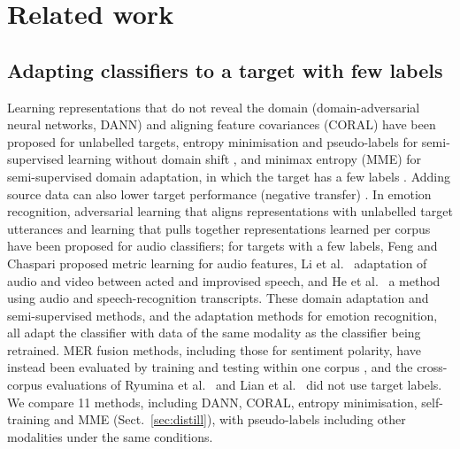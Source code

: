\section{Related work}\label{sec:related}

\subsection{Adapting classifiers to a target with few labels}\label{sec:rel-da}
Learning representations that do not reveal the domain (domain-adversarial neural networks, DANN) \cite{ganin2016dann} and aligning feature covariances (CORAL) \cite{sun2016coral} have been proposed for unlabelled targets, entropy minimisation and pseudo-labels for semi-supervised learning without domain shift \cite{grandvalet2004,lee2013pseudolabel}, and minimax entropy (MME) for semi-supervised domain adaptation, in which the target has a few labels \cite{saito2019mme}. Adding source data can also lower target performance (negative transfer) \cite{wang2019negative}. In emotion recognition, adversarial learning that aligns representations with unlabelled target utterances \cite{abdelwahab2018dann} and learning that pulls together representations learned per corpus \cite{gideon2021addog} have been proposed for audio classifiers; for targets with a few labels, Feng and Chaspari \cite{feng2023} proposed metric learning for audio features, Li et al.\ \cite{li2021acted} adaptation of audio and video between acted and improvised speech, and He et al.\ \cite{he2025m4ser} a method using audio and speech-recognition transcripts. These domain adaptation and semi-supervised methods, and the adaptation methods for emotion recognition, all adapt the classifier with data of the same modality as the classifier being retrained. MER fusion methods, including those for sentiment polarity, have instead been evaluated by training and testing within one corpus \cite{zadeh2017tfn,mittal2020m3er,yu2021selfmm,yun2024telme}, and the cross-corpus evaluations of Ryumina et al.\ \cite{ryumina2025} and Lian et al.\ \cite{lian2026merbench} did not use target labels. We compare 11 methods, including DANN, CORAL, entropy minimisation, self-training and MME (Sect.~\ref{sec:distill}), with pseudo-labels including other modalities under the same conditions.

